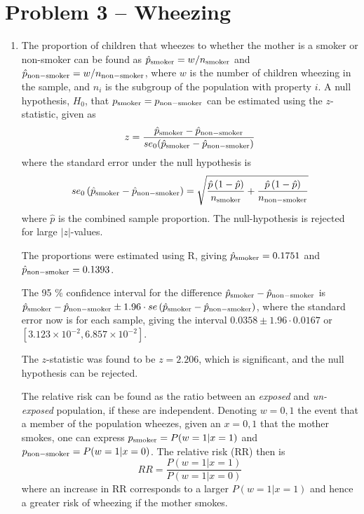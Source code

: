\documentclass[a4paper,11pt]{article}
\begin{document}
\section*{Problem 3 -- Wheezing}
\begin{enumerate}[label=3\alph*)]
    \item  The proportion of children that wheezes to whether the mother is a smoker or non-smoker can be found as $\hat{p}_{\rm smoker} = w / n_{\rm smoker}$ and  $\hat{p}_{\rm non-smoker} = w / n_{\rm non-smoker}$, where $w$ is the number of children wheezing in the sample, and $n_i$ is the subgroup of the population with property $i$. A null hypothesis, $H_0$, that $p_{\rm smoker} = p_{\rm non-smoker}$ can be estimated using the $z$-statistic, given as
        \begin{equation}
            z = \frac{\hat{p}_{\rm smoker} - \hat{p}_{\rm non-smoker}}{se_0(\hat{p}_{\rm smoker} - \hat{p}_{\rm non-smoker} ) }
            \label{eq:z_statistic}
        \end{equation}
        where the standard error under the null hypothesis is
        \begin{equation}
            se_0 \left( \hat{p}_{\rm smoker} - \hat{p}_{\rm non-smoker} \right) = \sqrt{ \frac{\hat{p} \left( 1 - \hat{p} \right)}{n_{\rm smoker}} + \frac{\hat{p}\left( 1- \hat{p} \right)}{n_{\rm non-smoker}}  }
            \label{eq:se_0}
        \end{equation}
        where $\hat{p}$ is the combined sample proportion. The null-hypothesis is rejected for large $|z|$-values.

        The proportions were estimated using R, giving $\hat{p}_{\rm smoker} = 0.1751$ and $\hat{p}_{\rm non-smoker} = 0.1393$.

        The 95 \% confidence interval for the difference $\hat{p}_{\rm smoker} - \hat{p}_{\rm non-smoker}$ is $\hat{p}_{\rm smoker} - \hat{p}_{\rm non-smoker} \pm 1.96 \cdot se \left( \hat{p}_{\rm smoker} - \hat{p}_{\rm non-smoker} \right)$, where the standard error now is for each sample, giving the interval $0.0358 \pm 1.96 \cdot 0.0167$ or $[3.123 \times 10^{-2}, 6.857 \times 10^{-2}]$.

        The $z$-statistic was found to be $z = 2.206$, which is significant, and the null hypothesis can be rejected.

        The relative risk can be found as the ratio between an \textit{exposed} and \textit{un-exposed} population, if these are independent. Denoting $w = 0,1$ the event that a member of the population wheezes, given an $x = 0,1$ that the mother smokes, one can express $p_{\rm smoker} = P( w=1 | x=1 )$ and $p_{\rm non-smoker} = P( w=1 | x=0)$. The relative risk (RR) then is
        \begin{equation}
            RR = \frac{P\left( w=1 | x=1 \right)}{P\left( w=1 | x=0 \right)}
            \label{eq:RR}
        \end{equation}
        where an increase in RR corresponds to a larger $P(w=1 | x=1)$ and hence a greater risk of wheezing if the mother smokes.


\end{enumerate}
\end{document}
